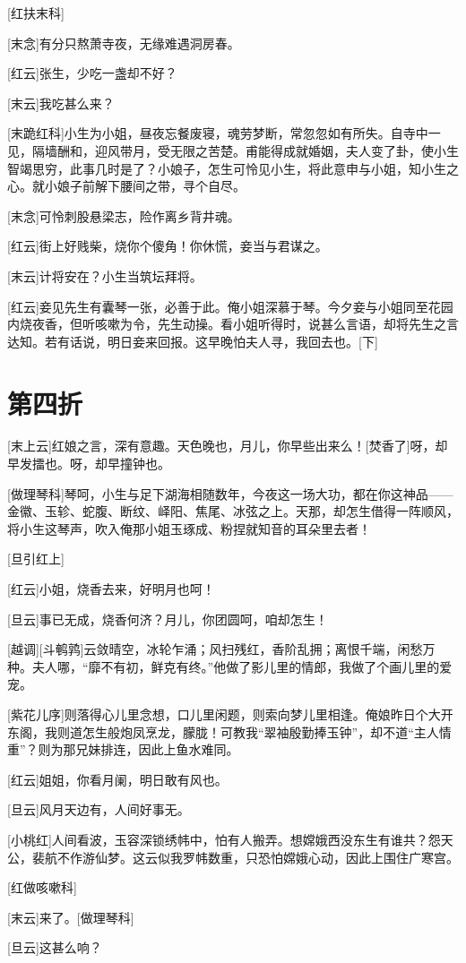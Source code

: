 \documentclass{book}
\newcommand\nchapter[1]{\chapter*{#1}\markboth{#1}{}\addcontentsline{toc}{chapter}{#1}}
\begin{document}
[红扶末科]

[末念]有分只熬萧寺夜，无缘难遇洞房春。

[红云]张生，少吃一盏却不好？

[末云]我吃甚么来？

[末跪红科]小生为小姐，昼夜忘餐废寝，魂劳梦断，常忽忽如有所失。自寺中一见，隔墙酬和，迎风带月，受无限之苦楚。甫能得成就婚姻，夫人变了卦，使小生智竭思穷，此事几时是了？小娘子，怎生可怜见小生，将此意申与小姐，知小生之心。就小娘子前解下腰间之带，寻个自尽。

[末念]可怜刺股悬梁志，险作离乡背井魂。

[红云]街上好贱柴，烧你个傻角！你休慌，妾当与君谋之。

[末云]计将安在？小生当筑坛拜将。

[红云]妾见先生有囊琴一张，必善于此。俺小姐深慕于琴。今夕妾与小姐同至花园内烧夜香，但听咳嗽为令，先生动操。看小姐听得时，说甚么言语，却将先生之言达知。若有话说，明日妾来回报。这早晚怕夫人寻，我回去也。[下]

\nchapter{第四折}

[末上云]红娘之言，深有意趣。天色晚也，月儿，你早些出来么！[焚香了]呀，却早发擂也。呀，却早撞钟也。

[做理琴科]琴呵，小生与足下湖海相随数年，今夜这一场大功，都在你这神品——金徽、玉轸、蛇腹、断纹、峄阳、焦尾、冰弦之上。天那，却怎生借得一阵顺风，将小生这琴声，吹入俺那小姐玉琢成、粉捏就知音的耳朵里去者！

[旦引红上]

[红云]小姐，烧香去来，好明月也呵！

[旦云]事已无成，烧香何济？月儿，你团圆呵，咱却怎生！

[越调][斗鹌鹑]云敛晴空，冰轮乍涌；风扫残红，香阶乱拥；离恨千端，闲愁万种。夫人哪，``靡不有初，鲜克有终。''他做了影儿里的情郎，我做了个画儿里的爱宠。

[紫花儿序]则落得心儿里念想，口儿里闲题，则索向梦儿里相逢。俺娘昨日个大开东阁，我则道怎生般炮凤烹龙，朦胧！可教我``翠袖殷勤捧玉钟''，却不道``主人情重''？则为那兄妹排连，因此上鱼水难同。

[红云]姐姐，你看月阑，明日敢有风也。

[旦云]风月天边有，人间好事无。

[小桃红]人间看波，玉容深锁绣帏中，怕有人搬弄。想嫦娥西没东生有谁共？怨天公，裴航不作游仙梦。这云似我罗帏数重，只恐怕嫦娥心动，因此上围住广寒宫。

[红做咳嗽科]

[末云]来了。[做理琴科]

[旦云]这甚么响？
\end{document}
